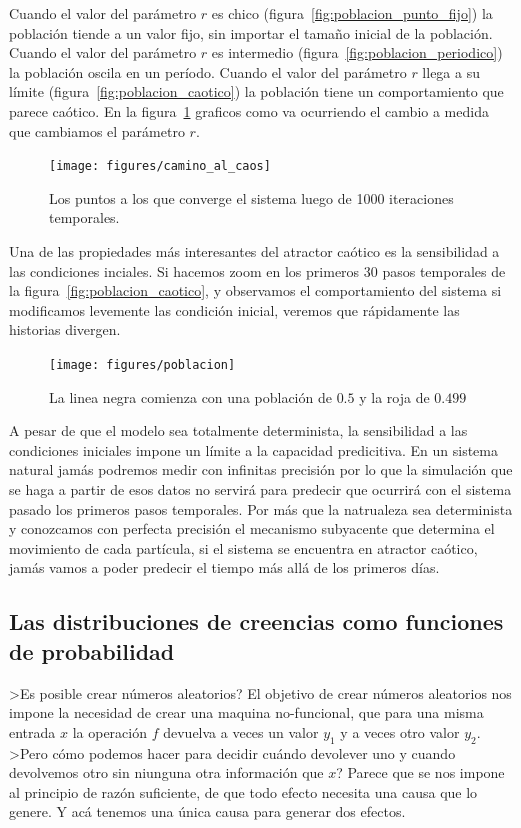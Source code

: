 \documentclass[a4paper,10pt]{book}
\begin{document}
%
Cuando el valor del parámetro $r$ es chico (figura~\ref{fig:poblacion_punto_fijo}) la población tiende a un valor fijo, sin importar el tamaño inicial de la población.
%
Cuando el valor del parámetro $r$ es intermedio (figura~\ref{fig:poblacion_periodico}) la población oscila en un período.
%
Cuando el valor del parámetro $r$ llega a su límite (figura~\ref{fig:poblacion_caotico}) la población tiene un comportamiento que parece caótico.
%
En la figura~\ref{fig:camino_al_caos} graficos como va ocurriendo el cambio a medida que cambiamos el parámetro $r$.
%
\begin{figure}[ht!]
    \centering
    \texttt{[image: figures/camino\_al\_caos]}
    \caption{Los puntos a los que converge el sistema luego de 1000 iteraciones temporales.}
    \label{fig:camino_al_caos}
\end{figure}
%
Una de las propiedades más interesantes del atractor caótico es la sensibilidad a las condiciones inciales.
%
Si hacemos zoom en los primeros 30 pasos temporales de la figura~\ref{fig:poblacion_caotico}, y observamos el comportamiento del sistema si modificamos levemente las condición inicial, veremos que rápidamente las historias divergen.
%
\begin{figure}[ht!]
    \centering
    \texttt{[image: figures/poblacion]}
    \caption{La linea negra comienza con una población de $0.5$ y la roja de $0.499$}
    \label{fig:sensibilidad}
\end{figure}
%
A pesar de que el modelo sea totalmente determinista, la sensibilidad a las condiciones iniciales impone un límite a la capacidad predicitiva.
%
En un sistema natural jamás podremos medir con infinitas precisión por lo que la simulación que se haga a partir de esos datos no servirá para predecir que ocurrirá con el sistema pasado los primeros pasos temporales.
%
Por más que la natrualeza sea determinista y conozcamos con perfecta precisión el mecanismo subyacente que determina el movimiento de cada partícula, si el sistema se encuentra en atractor caótico, jamás vamos a poder predecir el tiempo más allá de los primeros días.

\subsection{Las distribuciones de creencias como funciones de probabilidad}

 >Es posible crear números aleatorios?
 El objetivo de crear números aleatorios nos impone la necesidad de crear una maquina no-funcional, que para una misma entrada $x$ la operación $f$ devuelva a veces un valor $y_1$ y a veces otro valor $y_2$. 
 >Pero cómo podemos hacer para decidir cuándo devolever uno y cuando devolvemos otro sin niunguna otra información que $x$?
 Parece que se nos impone al principio de razón suficiente, de que todo efecto necesita una causa que lo genere.
 Y acá tenemos una única causa para generar dos efectos.
 
\end{document}
